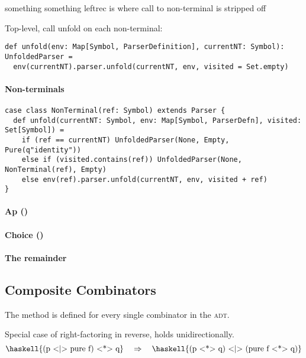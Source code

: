 \documentclass[../../main.tex]{subfiles}
\begin{document}
something something leftrec is where call to non-terminal is stripped off

Top-level, call unfold on each non-terminal:
\begin{verbatim}
def unfold(env: Map[Symbol, ParserDefinition], currentNT: Symbol): UnfoldedParser =
  env(currentNT).parser.unfold(currentNT, env, visited = Set.empty)
\end{verbatim}

\paragraph{Non-terminals}
\begin{verbatim}
case class NonTerminal(ref: Symbol) extends Parser {
  def unfold(currentNT: Symbol, env: Map[Symbol, ParserDefn], visited: Set[Symbol]) =
    if (ref == currentNT) UnfoldedParser(None, Empty, Pure(q"identity"))
    else if (visited.contains(ref)) UnfoldedParser(None, NonTerminal(ref), Empty)
    else env(ref).parser.unfold(currentNT, env, visited + ref)
}
\end{verbatim}

\paragraph{Ap (\scala{<*>})}
\paragraph{Choice (\scala{<|>})}
\paragraph{The remainder}

\subsection{Composite Combinators}




The  method is defined for every single combinator in the  \textsc{adt}.

Special case of right-factoring in reverse, holds unidirectionally.
\begin{equation*}
\text{\haskell{(p <|> pure f) <*> q}} \quad \Rightarrow \quad \text{\haskell{(p <*> q) <|> (pure f <*> q)}}
\end{equation*}
\end{document}

